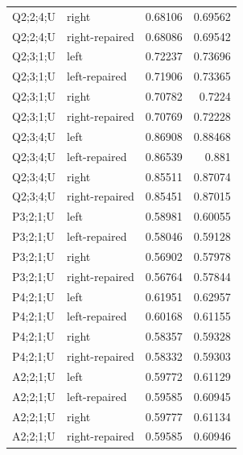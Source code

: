 {\begin{longtable}{@{}llrr@{}}
Q2;2;4;U & right & 0.68106 & 0.69562 \\
Q2;2;4;U & right-repaired & 0.68086 & 0.69542 \\
Q2;3;1;U & left & 0.72237 & 0.73696 \\
Q2;3;1;U & left-repaired & 0.71906 & 0.73365 \\
Q2;3;1;U & right & 0.70782 & 0.7224 \\
Q2;3;1;U & right-repaired & 0.70769 & 0.72228 \\
Q2;3;4;U & left & 0.86908 & 0.88468 \\
Q2;3;4;U & left-repaired & 0.86539 & 0.881 \\
Q2;3;4;U & right & 0.85511 & 0.87074 \\
Q2;3;4;U & right-repaired & 0.85451 & 0.87015 \\
P3;2;1;U & left & 0.58981 & 0.60055 \\
P3;2;1;U & left-repaired & 0.58046 & 0.59128 \\
P3;2;1;U & right & 0.56902 & 0.57978 \\
P3;2;1;U & right-repaired & 0.56764 & 0.57844 \\
P4;2;1;U & left & 0.61951 & 0.62957 \\
P4;2;1;U & left-repaired & 0.60168 & 0.61155 \\
P4;2;1;U & right & 0.58357 & 0.59328 \\
P4;2;1;U & right-repaired & 0.58332 & 0.59303 \\
A2;2;1;U & left & 0.59772 & 0.61129 \\
A2;2;1;U & left-repaired & 0.59585 & 0.60945 \\
A2;2;1;U & right & 0.59777 & 0.61134 \\
A2;2;1;U & right-repaired & 0.59585 & 0.60946 \\
\end{longtable}
}
